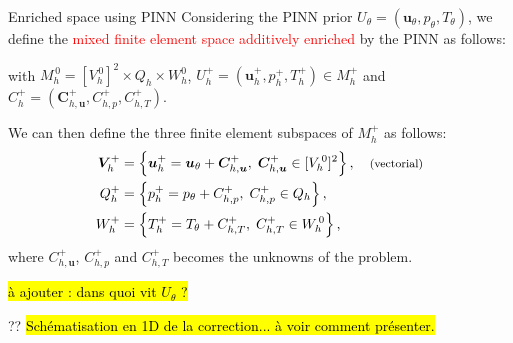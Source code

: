 \begin{frame}{Enriched space using PINN} %
    Considering the PINN prior $U_\theta = (\bm{u}_\theta, p_\theta, T_\theta)$, we define the \textcolor{red}{mixed finite element space additively enriched} by the PINN as follows:
    
    \begin{center}
    \end{center}

    with $M_h^{\, 0}=[V_h^{\, 0}]^2 \times Q_h \times W_h^0$,
    $U_h^+ = (\bm{u}_h^+, p_h^+, T_h^+) \in M_h^+$ and $C_h^+ = (\bm{C}_{h,\bm{u}}^+, C_{h,p}^+, C_{h,T}^+)$.

    \vspace{8pt}

    We can then define the three finite element subspaces of $M_h^+$ as follows:
    \begin{align*}
        \bm{V}_h^+ &= \left\{\bm{u}_h^+ = \bm{u}_\theta + \bm{C}_{h,\bm{u}}^+, \; \bm{C}_{h,\bm{u}}^+ \in [V_h^{\, 0}]^2\right\}, \quad \text{\footnotesize (vectorial)} \\
        Q_h^+ &= \left\{p_h^+ = p_\theta + C_{h,p}^+, \; C_{h,p}^+ \in Q_h\right\}, \\
        W_h^+ &= \left\{T_h^+ = T_\theta + C_{h,T}^+, \; C_{h,T}^+ \in W_h^{\, 0}\right\},
    \end{align*}
    where $C_{h,\bm{u}}^+$, $C_{h,p}^+$ and $C_{h,T}^+$ becomes the unknowns of the problem.
    
    \vspace{5pt}
    \hl{à ajouter : dans quoi vit $U_\theta$ ?}
\end{frame}

\begin{frame}{??}
    \hl{Schématisation en 1D de la correction... à voir comment présenter.}
    \begin{center}    
    \end{center}
\end{frame}

